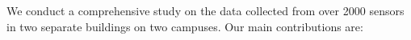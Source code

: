 


We conduct a comprehensive study on the data collected from over 2000 sensors in two separate buildings on two campuses. Our main contributions are:

